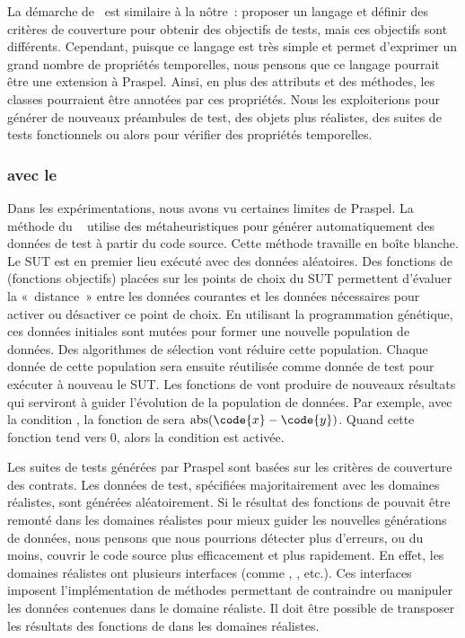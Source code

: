 La démarche de~ est similaire à la nôtre~: proposer un
langage et définir des critères de couverture pour obtenir des objectifs de
tests, mais ces objectifs sont différents. Cependant, puisque ce langage est
très simple et permet d'exprimer un grand nombre de propriétés temporelles, nous
pensons que ce langage pourrait être une extension à Praspel. Ainsi, en plus des
attributs et des méthodes, les classes pourraient être annotées par ces
propriétés. Nous les exploiterions pour générer de nouveaux préambules de test,
des objets plus réalistes, des suites de tests fonctionnels ou alors pour
vérifier des propriétés temporelles.

\subsubsection{ avec le }

Dans les expérimentations, nous avons vu certaines limites de Praspel. La
méthode du ~ utilise des
métaheuristiques pour générer automatiquement des données de test à partir du
code source. Cette méthode travaille en boîte blanche. Le SUT est en premier
lieu exécuté avec des données aléatoires. Des fonctions de 
(fonctions objectifs) placées sur les points de choix du SUT permettent
d'évaluer la «~distance~» entre les données courantes et les données nécessaires
pour activer ou désactiver ce point de choix. En utilisant la programmation
génétique, ces données initiales sont mutées pour former une nouvelle population
de données. Des algorithmes de sélection vont réduire cette population. Chaque
donnée de cette population sera ensuite réutilisée comme donnée de test pour
exécuter à nouveau le SUT. Les fonctions de  vont produire de
nouveaux résultats qui serviront à guider l'évolution de la population de
données. Par exemple, avec la condition , la fonction de
 sera $\mathrm{abs}(\code{x} - \code{y})$. Quand cette
fonction tend vers 0, alors la condition est activée.

Les suites de tests générées par Praspel sont basées sur les critères de
couverture des contrats. Les données de test, spécifiées majoritairement avec
les domaines réalistes, sont générées aléatoirement. Si le résultat des
fonctions de  pouvait être remonté dans les domaines
réalistes pour mieux guider les nouvelles générations de données, nous pensons
que nous pourrions détecter plus d'erreurs, ou du moins, couvrir le code source
plus efficacement et plus rapidement. En effet, les domaines réalistes ont
plusieurs interfaces (comme , , 
etc.). Ces interfaces imposent l'implémentation de méthodes permettant de
contraindre ou manipuler les données contenues dans le domaine réaliste. Il doit
être possible de transposer les résultats des fonctions de 
dans les domaines réalistes.

